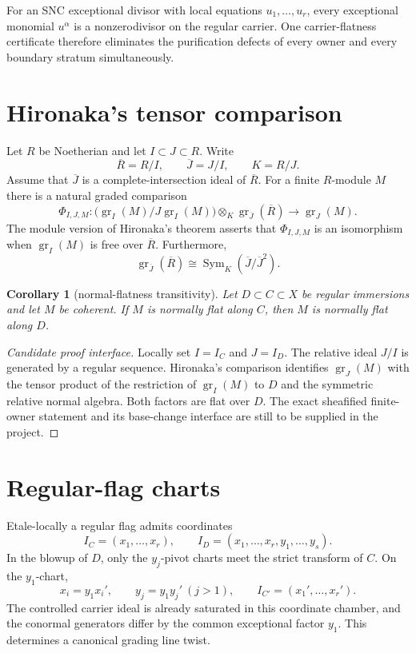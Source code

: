 \documentclass[11pt]{amsart}
\newtheorem{corollary}[theorem]{Corollary}
\begin{document}
For an SNC exceptional divisor with local equations $u_1,\ldots,u_r$, every
exceptional monomial $u^\alpha$ is a nonzerodivisor on the regular carrier.
One carrier-flatness certificate therefore eliminates the purification defects
of every owner and every boundary stratum simultaneously.

\section{Hironaka's tensor comparison}
Let $R$ be Noetherian and let $I\subset J\subset R$.  Write
\[
 \overline R=R/I,\qquad \overline J=J/I,\qquad K=R/J.
\]
Assume that $\overline J$ is a complete-intersection ideal of $\overline R$.
For a finite $R$-module $M$ there is a natural graded comparison
\[
 \Phi_{I,J,M}:\bigl(\operatorname{gr}_I(M)/J\operatorname{gr}_I(M)\bigr)
 \otimes_K \operatorname{gr}_{\overline J}(\overline R)
 \longrightarrow \operatorname{gr}_J(M).
\]
The module version of Hironaka's theorem asserts that $\Phi_{I,J,M}$ is an
isomorphism when $\operatorname{gr}_I(M)$ is free over $\overline R$.
Furthermore,
\[
 \operatorname{gr}_{\overline J}(\overline R)
 \cong \operatorname{Sym}_K(\overline J/\overline J^2).
\]

\begin{corollary}[normal-flatness transitivity]
Let $D\subset C\subset X$ be regular immersions and let $M$ be coherent.  If
$M$ is normally flat along $C$, then $M$ is normally flat along $D$.
\end{corollary}

\begin{proof}[Candidate proof interface]
Locally set $I=I_C$ and $J=I_D$.  The relative ideal $J/I$ is generated by a
regular sequence.  Hironaka's comparison identifies $\operatorname{gr}_J(M)$
with the tensor product of the restriction of $\operatorname{gr}_I(M)$ to $D$
and the symmetric relative normal algebra.  Both factors are flat over $D$.
The exact sheafified finite-owner statement and its base-change interface are
still to be supplied in the project.
\end{proof}

\section{Regular-flag charts}
Etale-locally a regular flag admits coordinates
\[
 I_C=(x_1,\ldots,x_r),\qquad
 I_D=(x_1,\ldots,x_r,y_1,\ldots,y_s).
\]
In the blowup of $D$, only the $y_j$-pivot charts meet the strict transform of
$C$.  On the $y_1$-chart,
\[
 x_i=y_1x_i',\qquad y_j=y_1y_j'\ (j>1),
 \qquad I_{C'}=(x_1',\ldots,x_r').
\]
The controlled carrier ideal is already saturated in this coordinate chamber,
and the conormal generators differ by the common exceptional factor $y_1$.
This determines a canonical grading line twist.
\end{document}
